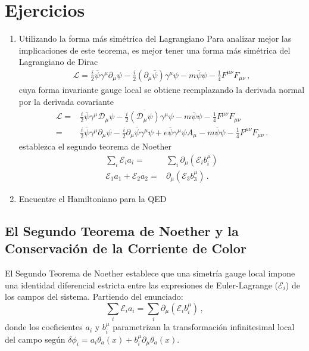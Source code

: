 \section{Ejercicios}
\begin{enumerate}
\item Utilizando la forma más simétrica del Lagrangiano
Para analizar mejor las implicaciones de este teorema, es mejor tener una forma más simétrica del Lagrangiano de Dirac
\begin{align}
\mathcal{L}=\frac{i}{2}\overline{\psi} \gamma^\mu{\partial_{\mu}} \psi-\frac{i}{2}\left(\partial_{\mu} \overline{\psi}\right) \gamma^{\mu} \psi-m \overline{\psi} \psi-\frac{1}{4} F^{\mu \nu} F_{\mu \nu}\,,
\end{align}
cuya forma invariante gauge local se obtiene reemplazando la derivada normal por la derivada covariante
\begin{align}
\label{eq:silagqed}
\mathcal{L}=&\frac{i}{2}\overline{\psi} \gamma^\mu{\mathcal{D}_{\mu}} \psi-\frac{i}{2}\overline{\left(\mathcal{D}_{\mu} \psi\right)} \gamma^{\mu} \psi-m \overline{\psi} \psi-\frac{1}{4} F^{\mu \nu} F_{\mu \nu}\nonumber\\
=&\frac{i}{2}\overline{\psi} \gamma^\mu{\partial_{\mu}} \psi-\frac{i}{2}\partial_{\mu} \overline{\psi} \gamma^{\mu} \psi
+e \bar{\psi} \gamma^{\mu} \psi A_{\mu}
-m \overline{\psi} \psi-\frac{1}{4} F^{\mu \nu} F_{\mu \nu}\,.
\end{align}
establezca el segundo teorema de Noether
\begin{align}
  \sum_i \mathcal{E}_ia_i=&\sum_i  \partial_{\mu}   \left(  \mathcal{E}_i b^{\mu}_i  \right)\nonumber\\
  \mathcal{E}_1a_1+\mathcal{E}_2a_2=&
   \partial_{\mu}   \left(  \mathcal{E}_3 b^{\mu}_3  \right)\,.
\end{align}
\item Encuentre el Hamiltoniano para la QED
\end{enumerate}


\subsection{El Segundo Teorema de Noether y la Conservación de la Corriente de Color}
\label{sec:noether_2_completo}

El Segundo Teorema de Noether establece que una simetría gauge local impone una identidad diferencial estricta entre las expresiones de Euler-Lagrange ($\mathcal{E}_i$) de los campos del sistema. Partiendo del enunciado:
\begin{equation}
    \sum_i \mathcal{E}_i a_i = \sum_i \partial_\mu (\mathcal{E}_i b^\mu_i) \, ,
    \label{eq:noether2_formula}
\end{equation}
donde los coeficientes $a_i$ y $b_i^\mu$ parametrizan la transformación infinitesimal local del campo según $\delta \phi_i = a_i \theta_a(x) + b^\mu_i \partial_\mu \theta_a(x)$.

